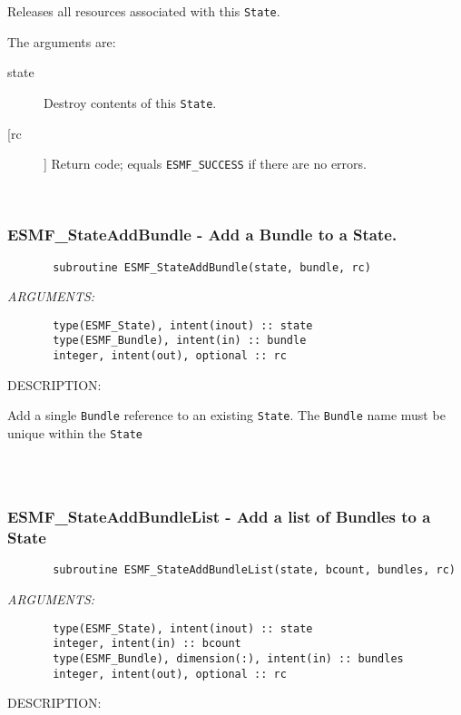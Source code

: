        Releases all resources associated with this {\tt State}.
  
       The arguments are:
       \begin{description}
  
       \item[state]
         Destroy contents of this {\tt State}.
  
       \item[[rc]]
         Return code; equals {\tt ESMF\_SUCCESS} if there are no errors.
  
       \end{description}
   
 
\mbox{}\hrulefill\ 
 
\subsubsection{ESMF\_StateAddBundle - Add a Bundle to a State.}


  
\begin{verbatim}       subroutine ESMF_StateAddBundle(state, bundle, rc)\end{verbatim}{\em ARGUMENTS:}
\begin{verbatim}       type(ESMF_State), intent(inout) :: state
       type(ESMF_Bundle), intent(in) :: bundle
       integer, intent(out), optional :: rc
       \end{verbatim}
{\sf DESCRIPTION:\\ }


        Add a single {\tt Bundle} reference to an existing {\tt State}.
        The {\tt Bundle} name must be unique within the {\tt State}
  
\begin{verbatim} \end{verbatim}
 
 
\mbox{}\hrulefill\ 
 
\subsubsection{ESMF\_StateAddBundleList - Add a list of Bundles to a State}

 
\begin{verbatim}       subroutine ESMF_StateAddBundleList(state, bcount, bundles, rc)\end{verbatim}{\em ARGUMENTS:}
\begin{verbatim}       type(ESMF_State), intent(inout) :: state 
       integer, intent(in) :: bcount
       type(ESMF_Bundle), dimension(:), intent(in) :: bundles
       integer, intent(out), optional :: rc     \end{verbatim}
{\sf DESCRIPTION:\\ }



